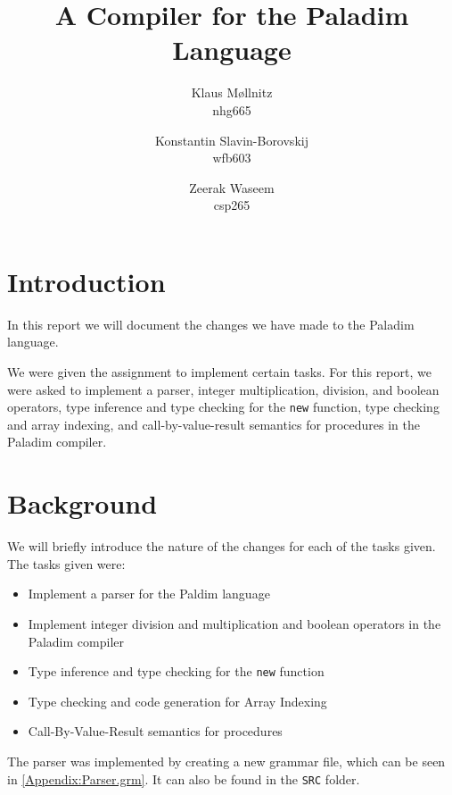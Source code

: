 \documentclass[10pt]{article}
\title{A Compiler for the \textbf{Paladim} Language}
\author{
    Klaus Møllnitz\\
    nhg665
  \and
    Konstantin Slavin-Borovskij\\
    wfb603
  \and
    Zeerak Waseem\\
    csp265
}
\begin{document}
\maketitle

\newpage
\tableofcontents
\section{Introduction}
In this report we will document the changes we have made to the Paladim language. 

We were given the assignment to implement certain tasks. For this report, we were asked to implement a parser, integer multiplication, division, and boolean operators, type inference and type checking for the \texttt{new} function, type checking and array indexing, and call-by-value-result semantics for procedures in the Paladim compiler.

\section{Background}

We will briefly introduce the nature of the changes for each of the tasks given. The tasks given were:
\begin{itemize}
\item Implement a parser for the Paldim language
\item Implement integer division and multiplication and boolean operators in the Paladim compiler
\item Type inference and type checking for the \texttt{new} function
\item Type checking and code generation for Array Indexing
\item Call-By-Value-Result semantics for procedures
\end{itemize}

The parser was implemented by creating a new grammar file, which can be seen in \ref{Appendix:Parser.grm}. It can also be found in the \texttt{SRC} folder.\\
\end{document}
